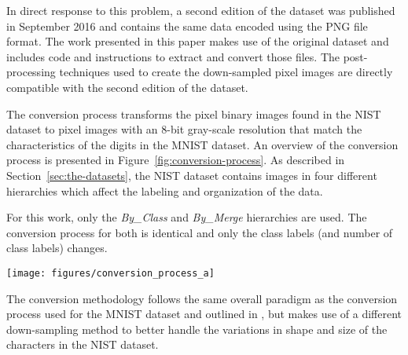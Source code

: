 \documentclass[conference]{IEEEtran}
\begin{document}
In direct response to this problem, a second edition of the dataset was published in September 2016 and contains the same data encoded using the PNG file format. The work presented in this paper makes use of the original dataset and includes code and instructions to extract and convert those files. The post-processing techniques used to create the down-sampled  pixel images are directly compatible with the second edition of the dataset.

The conversion process transforms the  pixel binary images found in the NIST dataset to  pixel images with an 8-bit gray-scale resolution that match the characteristics of the digits in the MNIST dataset. An overview of the conversion process is presented in Figure~\ref{fig:conversion-process}. As described in Section~\ref{sec:the-datasets}, the NIST dataset contains  images in four different hierarchies which affect the labeling and organization of the data. 

For this work, only the \textit{By\_Class} and \textit{By\_Merge} hierarchies are used. 
The conversion process for both is identical and only the class labels (and number of class labels) changes.

\begin{figure*}
  \centering
  \texttt{[image: figures/conversion\_process\_a]}
  \caption{\textbf{Diagram of the conversion process used to convert the NIST dataset.} The original images are stored as  pixel binary images as shown in (a). A Gaussian filter with  is applied to the image to soften the edges as shown in (b). As the characters do not fill the entire image, the region around the actual digit is extracted (c). The digit is then placed and centered into a square image (d) with the aspect ratio preserved. The region of interest is padded with a 2 pixel border when placed into the square image, matching the clear border around all the digits in the MNIST dataset. Finally, the image is down-sampled to  pixels using bi-cubic interpolation. The range of intensity values are then scaled to , resulting in the  pixel gray-scale images shown in (e).}
  \label{fig:conversion-process}
\end{figure*}

The conversion methodology follows the same overall paradigm as the conversion process used for the MNIST dataset and outlined in \cite{LeCun1998}, but makes use of a different down-sampling method to better handle the variations in shape and size of the characters in the NIST dataset.
\end{document}
